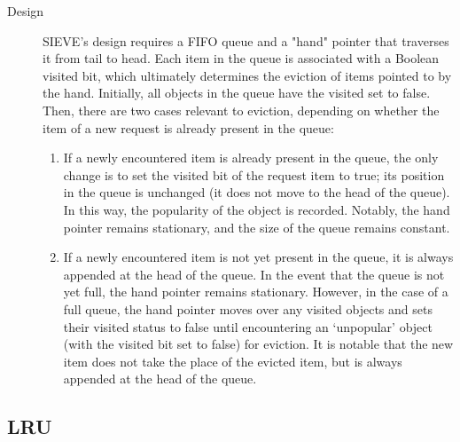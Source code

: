 \begin{description}
    \item[Design] 
    
    SIEVE's design requires a FIFO queue and a "hand" pointer that traverses it from tail to head. Each item in the queue is associated with a Boolean visited bit, which ultimately determines the eviction of items pointed to by the hand. Initially, all objects in the queue have the visited set to false. Then, there are two cases relevant to eviction, depending on whether the item of a new request is already present in the queue:

    \begin{enumerate}[label=(\arabic*)]
        \item If a newly encountered item is already present in the queue, the only change is to set the visited bit of the request item to true; its position in the queue is unchanged (it does not move to the head of the queue). In this way, the popularity of the object is recorded. Notably, the hand pointer remains stationary, and the size of the queue remains constant.
        \item If a newly encountered item is not yet present in the queue, it is always appended at the head of the queue. In the event that the queue is not yet full, the hand pointer remains stationary. However, in the case of a full queue, the hand pointer moves over any visited objects and sets their visited status to false until encountering an `unpopular' object (with the visited bit set to false) for eviction. It is notable that the new item does not take the place of the evicted item, but is always appended at the head of the queue. 
    \end{enumerate}
    
\end{description}








\subsection{LRU}

